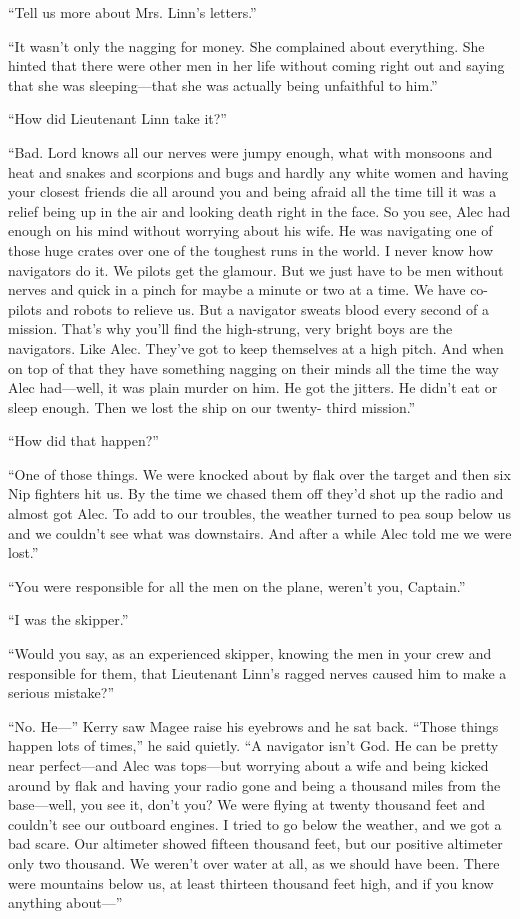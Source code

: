 \documentclass{novel}
\begin{document}
“Tell us more about Mrs. Linn’s letters.”

“It wasn’t only the nagging for money. She complained about everything. She hinted that there were other men in her life without coming right out and saying that she was sleeping—that she was actually being unfaithful to him.”

“How did Lieutenant Linn take it?”

“Bad. Lord knows all our nerves were jumpy enough, what with monsoons and heat and snakes and scorpions and bugs and hardly any white women and having your closest friends die all around you and being afraid all the time till it was a relief being up in the air and looking death right in the face. So you see, Alec had enough on his mind without worrying about his wife. He was navigating one of those huge crates over one of the toughest runs in the world. I never know how navigators do it. We pilots get the glamour. But we just have to be men without nerves and quick in a pinch for maybe a minute or two at a time. We have co-pilots and robots to relieve us. But a navigator sweats blood every second of a mission. That’s why you’ll find the high-strung, very bright boys are the navigators. Like Alec. They’ve got to keep themselves at a high pitch. And when on top of that they have something nagging on their minds all the time the way Alec had—well, it was plain murder on him. He got the jitters. He didn’t eat or sleep enough. Then we lost the ship on our twenty- third mission.”

“How did that happen?”

“One of those things. We were knocked about by flak over the target and then six Nip fighters hit us. By the time we chased them off they’d shot up the radio and almost got Alec. To add to our troubles, the weather turned to pea soup below us and we couldn’t see what was downstairs. And after a while Alec told me we were lost.”

“You were responsible for all the men on the plane, weren’t you, Captain.”

“I was the skipper.”

“Would you say, as an experienced skipper, knowing the men in your crew and responsible for them, that Lieutenant Linn’s ragged nerves caused him to make a serious mistake?”

“No. He—” Kerry saw Magee raise his eyebrows and he sat back. “Those things happen lots of times,” he said quietly. “A navigator isn’t God. He can be pretty near perfect—and Alec was tops—but worrying about a wife and being kicked around by flak and having your radio gone and being a thousand miles from the base—well, you see it, don’t you? We were flying at twenty thousand feet and couldn’t see our outboard engines. I tried to go below the weather, and we got a bad scare. Our altimeter showed fifteen thousand feet, but our positive altimeter only two thousand. We weren’t over water at all, as we should have been. There were mountains below us, at least thirteen thousand feet high, and if you know anything about—”
\end{document}

